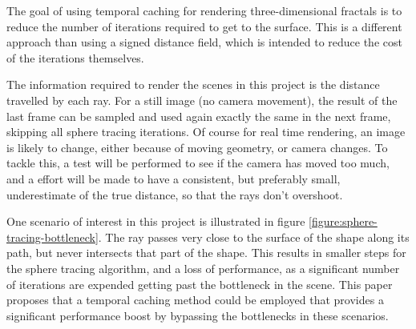 The goal of using temporal caching for rendering three-dimensional fractals is to reduce the number of iterations required to get to the surface. This is a different approach than using a signed distance field, which is intended to reduce the cost of the iterations themselves.\newline

The information required to render the scenes in this project is the distance travelled by each ray. For a still image (no camera movement), the result of the last frame can be sampled and used again exactly the same in the next frame, skipping all sphere tracing iterations. Of course for real time rendering, an image is likely to change, either because of moving geometry, or camera changes. To tackle this, a test will be performed to see if the camera has moved too much, and a effort will be made to have a consistent, but preferably small, underestimate of the true distance, so that the rays don't overshoot.\newline

One scenario of interest in this project is illustrated in figure \ref{figure:sphere-tracing-bottleneck}. The ray passes very close to the surface of the shape along its path, but never intersects that part of the shape. This results in smaller steps for the sphere tracing algorithm, and a loss of performance, as a significant number of iterations are expended getting past the bottleneck in the scene. This paper proposes that a temporal caching method could be employed that provides a significant performance boost by bypassing the bottlenecks in these scenarios.
